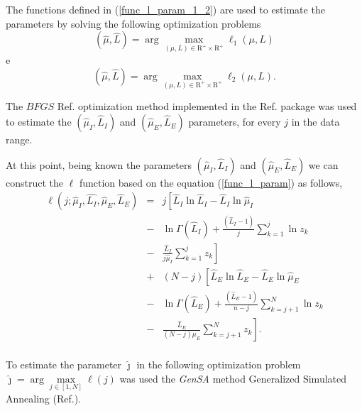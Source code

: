 \documentclass[conference]{IEEEtran}
\begin{document}
The functions defined in (\ref{func_l_param_1_2}) are used to estimate the parameters by solving the following optimization problems 
\begin{equation}
(\hat{\mu},\hat{L})= \arg\max\limits_{(\mu,L)\in \mathrm{R}^{+}\times\mathrm{R}^{+}}\ell_1(\mu,L)
\end{equation}
e 
\begin{equation}
(\widehat{\mu},\widehat{L})= \arg\max\limits_{(\mu,L)\in \mathrm{R}^{+}\times\mathrm{R}^{+}}\ell_2(\mu,L).
\end{equation} 

The $BFGS$ Ref.\cite{nw} optimization method implemented in the  Ref.\cite{ht} package was used to estimate the $(\hat{\mu}_I, \hat{L}_I)$ and $(\hat{\mu}_E, \hat{L}_E)$ parameters, for every $j$ in the data range.

At this point, being known the parameters $(\hat{\mu}_I, \hat{L}_I)$ and $(\hat{\mu}_E, \hat{L}_E)$ we can construct the $\ell$ function based on the equation (\ref{func_l_param}) as follows,
\begin{equation}\label{cap_acf_16}
 \begin{array}{lll}
\ell(j;\hat{\mu}_I, \hat{L_I},\hat{\mu}_E, \hat{L}_E)&=&j\left[  \hat{L}_I\ln \hat{L}_I -\hat{L}_I \ln \hat{\mu}_I \right.\\
                                                      &-& \ln \Gamma(\hat{L}_I) + \frac{(\hat{L}_I  - 1)}{j} \sum_{k=1}^{j}  \ln z_k  \\
                                                      &-&\left.\frac{\hat{L}_I}{j\hat{\mu}_I} \sum_{k=1}^{j}   z_k\right] \\
                                               &+&(N-j)\left[\hat{L}_E\ln \hat{L}_E -\hat{L}_E \ln \hat{\mu}_E\right.\\
                                               &-&\ln \Gamma(\hat{L}_E) + \frac{(\hat{L}_E - 1)}{n-j} \sum_{k=j+1}^{N}\ln z_k\\
                                               &-&\left.\frac{\hat{L}_E}{(N-j)\mu_E} \sum_{k=j+1}^{N}z_k\right]. \\
 \end{array}
 \end{equation}

To estimate the parameter $\hat{\jmath}$ in the following optimization problem $\hat{\jmath}= \arg\max\limits_{j\in [1,N]}\ell(j)$ was used the \textit{GenSA} method Generalized Simulated Annealing (Ref.\cite{xgsh}).
\end{document}
